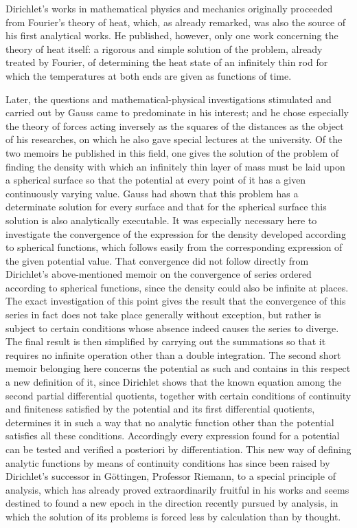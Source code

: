 \documentclass[11pt]{article}
\begin{document}
Dirichlet's works in mathematical physics and mechanics originally proceeded from Fourier's theory of heat, which, as already remarked, was also the source of his first analytical works. He published, however, only one work concerning the theory of heat itself: a rigorous and simple solution of the problem, already treated by Fourier, of determining the heat state of an infinitely thin rod for which the temperatures at both ends are given as functions of time.

Later, the questions and mathematical-physical investigations stimulated and carried out by Gauss came to predominate in his interest; and he chose especially the theory of forces acting inversely as the squares of the distances as the object of his researches, on which he also gave special lectures at the university. Of the two memoirs he published in this field, one gives the solution of the problem of finding the density with which an infinitely thin layer of mass must be laid upon a spherical surface so that the potential at every point of it has a given continuously varying value. Gauss had shown that this problem has a determinate solution for every surface and that for the spherical surface this solution is also analytically executable. It was especially necessary here to investigate the convergence of the expression for the density developed according to spherical functions, which follows easily from the corresponding expression of the given potential value. That convergence did not follow directly from Dirichlet's above-mentioned memoir on the convergence of series ordered according to spherical functions, since the density could also be infinite at places. The exact investigation of this point gives the result that the convergence of this series in fact does not take place generally without exception, but rather is subject to certain conditions whose absence indeed causes the series to diverge. The final result is then simplified by carrying out the summations so that it requires no infinite operation other than a double integration. The second short memoir belonging here concerns the potential as such and contains in this respect a new definition of it, since Dirichlet shows that the known equation among the second partial differential quotients, together with certain conditions of continuity and finiteness satisfied by the potential and its first differential quotients, determines it in such a way that no analytic function other than the potential satisfies all these conditions. Accordingly every expression found for a potential can be tested and verified a posteriori by differentiation. This new way of defining analytic functions by means of continuity conditions has since been raised by Dirichlet's successor in Göttingen, Professor Riemann, to a special principle of analysis, which has already proved extraordinarily fruitful in his works and seems destined to found a new epoch in the direction recently pursued by analysis, in which the solution of its problems is forced less by calculation than by thought.
\end{document}
